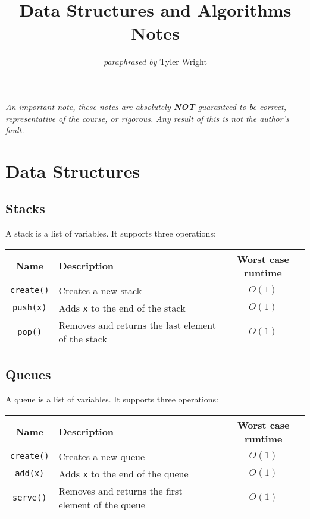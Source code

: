 \documentclass[a4paper, 12pt, twoside]{article}
\begin{document}
\title{Data Structures and Algorithms Notes}
\date{}
\author{\textit{paraphrased by} Tyler Wright}
\maketitle

\vfill

\textit{An important note, these notes are absolutely \textbf{NOT}
  guaranteed to be correct, representative of the course, or rigorous.
  Any result of this is not the author's fault.}

\newpage

\section{Data Structures}

\subsection{Stacks}

A stack is a list of variables. It supports three operations:

\begin{center}
  \begin{tabular}{ || c | p{6.5cm} | c || }
    \hline
    Name & Description & Worst case runtime \\
    \hline
    \texttt{create()} & Creates a new stack & $O(1)$ \\
    \hline
    \texttt{push(x)} & Adds \texttt{x} to the end of the stack & $O(1)$ \\
    \hline
    \texttt{pop()} & Removes and returns the last element of the stack & $O(1)$ \\
    \hline
  \end{tabular}
\end{center}

\subsection{Queues}

A queue is a list of variables. It supports three operations:

\begin{center}
  \begin{tabular}{ || c | p{6.5cm} | c || }
    \hline
    Name & Description & Worst case runtime \\
    \hline
    \texttt{create()} & Creates a new queue & $O(1)$ \\
    \hline
    \texttt{add(x)} & Adds \texttt{x} to the end of the queue & $O(1)$ \\
    \hline
    \texttt{serve()} & Removes and returns the first element of the queue & $O(1)$ \\
    \hline
  \end{tabular}
\end{center}
\end{document}
